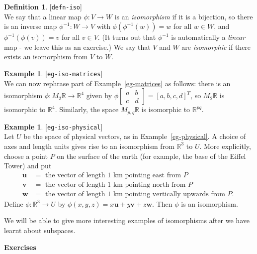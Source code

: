 \documentclass{amsart}
\newcommand{\lbl}[1]{\label{#1}\textup{[\texttt{#1}]}\ \\}
\newcommand{\lbl}{\label}
\newcommand{\R}         {{\mathbb{R}}}
\newcommand{\bsm}       {\left[\begin{smallmatrix}}
\newcommand{\esm}       {\end{smallmatrix}\right]}
\newcommand{\xra}       {\xrightarrow}
\newcommand{\vu}        {\mathbf{u}}
\newcommand{\vv}        {\mathbf{v}}
\newcommand{\vw}        {\mathbf{w}}
\renewcommand{\:}       {\colon}
\theoremstyle{definition}
\newtheorem{definition}[theorem]{Definition}
\newtheorem{example}[theorem]{Example}
\begin{document}
\begin{definition}\lbl{defn-iso}
 We say that a linear map $\phi\:V\to W$ is an
 \emph{isomorphism} if it is a bijection, so there is an
 inverse map $\phi^{-1}\:W\xra{}V$ with
 $\phi(\phi^{-1}(w))=w$ for all $w\in W$, and
 $\phi^{-1}(\phi(v))=v$ for all $v\in V$.  (It turns out
 that $\phi^{-1}$ is automatically a \emph{linear} map - we
 leave this as an exercise.)  We say that $V$ and $W$ are
 \emph{isomorphic} if there exists an isomorphism from $V$
 to $W$.
\end{definition}
\begin{example}\lbl{eg-iso-matrices}
 We can now rephrase part of Example~\ref{eg-matrices} as
 follows: there is an isomorphism $\phi\:M_2\R\xra{}\R^4$
 given by $\phi\bsm a&b\\ c&d\esm=[a,b,c,d]^T$, so $M_2\R$ is
 isomorphic to $\R^4$.  Similarly, the space $M_{p,q}\R$ is
 isomorphic to $\R^{pq}$.
\end{example}
\begin{example}\lbl{eg-iso-physical}
 Let $U$ be the space of physical vectors, as in
 Example~\ref{eg-physical}.  A choice of axes and length
 units gives rise to an isomorphism from $\R^3$ to $U$.
 More explicitly, choose a point $P$ on the surface of the
 earth (for example, the base of the Eiffel Tower) and put
 \begin{align*}
  \vu &=
   \text{ the vector of length 1 km pointing east from $P$ } \\
  \vv &=
   \text{ the vector of length 1 km pointing north from $P$ } \\
  \vw &=
   \text{ the vector of length 1 km pointing vertically upwards from $P$. }
 \end{align*}
 Define $\phi\:\R^3\to U$ by $\phi(x,y,z)=x\vu+y\vv+z\vw$.
 Then $\phi$ is an isomorphism.
\end{example}
We will be able to give more interesting examples of
isomorphisms after we have learnt about subspaces.


\begin{center}
 \Large \textbf{Exercises}
\end{center}
\end{document}
